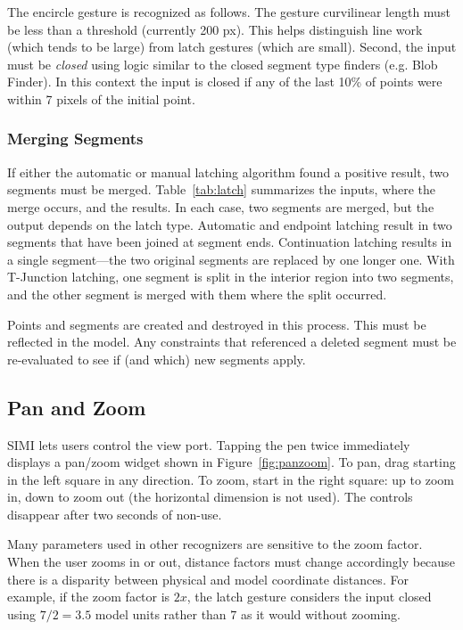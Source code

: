 The encircle gesture is recognized as follows. The gesture curvilinear
length must be less than a threshold (currently 200 px). This helps
distinguish line work (which tends to be large) from latch gestures
(which are small). Second, the input must be \textit{closed} using
logic similar to the closed segment type finders (e.g. Blob
Finder). In this context the input is closed if any of the last 10\%
of points were within 7 pixels of the initial point.

\subsubsection{Merging Segments}



If either the automatic or manual latching algorithm found a positive
result, two segments must be merged. Table~\ref{tab:latch} summarizes
the inputs, where the merge occurs, and the results. In each case, two
segments are merged, but the output depends on the latch
type. Automatic and endpoint latching result in two segments that have
been joined at segment ends. Continuation latching results in a single
segment---the two original segments are replaced by one longer
one. With T-Junction latching, one segment is split in the interior
region into two segments, and the other segment is merged with them
where the split occurred.

Points and segments are created and destroyed in this process. This
must be reflected in the model. Any constraints that referenced a
deleted segment must be re-evaluated to see if (and which) new
segments apply.

\subsection{Pan and Zoom}

SIMI lets users control the view port. Tapping the pen twice
immediately displays a pan/zoom widget shown in
Figure~\ref{fig:panzoom}. To pan, drag starting in the left square in
any direction. To zoom, start in the right square: up to zoom in, down
to zoom out (the horizontal dimension is not used). The controls
disappear after two seconds of non-use.

Many parameters used in other recognizers are sensitive to the zoom
factor. When the user zooms in or out, distance factors must change
accordingly because there is a disparity between physical and model
coordinate distances. For example, if the zoom factor is $2x$, the
latch gesture considers the input closed using $7/2=3.5$ model
units rather than $7$ as it would without zooming.

